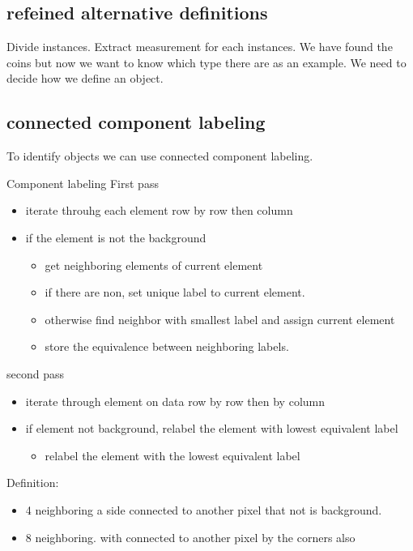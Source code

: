 \subsection*{refeined alternative definitions}
Divide instances. Extract measurement for each instances. We have found the coins but now we want to know which type there are as an example. We need to decide how we define an object. 

\subsection*{connected component labeling}
To identify objects we can use connected component labeling.

\begin{example}{Component labeling }
First pass
\begin{itemize}
	\item iterate throuhg each element row by row then column
	\item if the element is not the background
	\begin{itemize}
		\item get neighboring elements of current element
		\item if there are non, set unique label to current element. 
		\item otherwise find neighbor with smallest label and assign current element
		\item store the equivalence between neighboring labels. 
	\end{itemize}
\end{itemize}
second pass
\begin{itemize}
	\item iterate through element on data row by row then by column
	\item if element not background, relabel the element with lowest equivalent label
	\begin{itemize}
		\item relabel the element with the lowest equivalent label
	\end{itemize}
\end{itemize}
\end{example}	



\begin{definition}{Definition: }
\begin{itemize}
	\item 4 neighboring a side connected to another pixel that not is background. 
	\item 8 neighboring. with connected to another pixel by the corners also
\end{itemize}
\end{definition}


